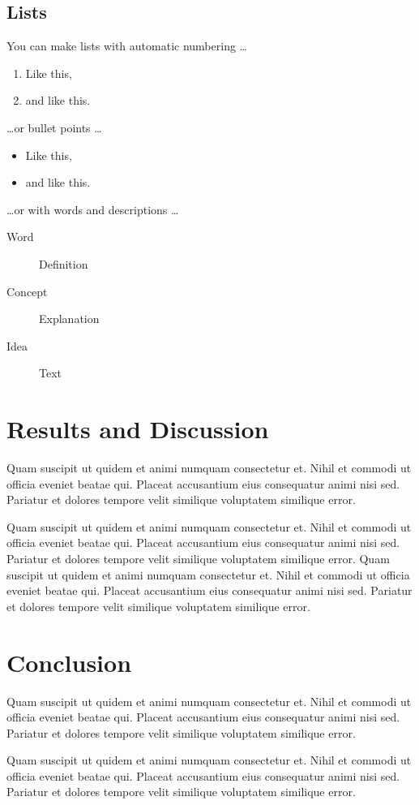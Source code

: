 \documentclass[fleqn,10pt]{amj}
\begin{document}
\subsection{Lists}

You can make lists with automatic numbering \dots

\begin{enumerate}[noitemsep] 
\item Like this,
\item and like this.
\end{enumerate}
\dots or bullet points \dots
\begin{itemize}[noitemsep] 
\item Like this,
\item and like this.
\end{itemize}
\dots or with words and descriptions \dots
\begin{description}
\item[Word] Definition
\item[Concept] Explanation
\item[Idea] Text
\end{description}

\section{Results and Discussion}
Quam suscipit ut quidem et animi numquam consectetur et. Nihil et commodi ut officia eveniet beatae qui. Placeat accusantium eius consequatur animi nisi sed. Pariatur et dolores tempore velit similique voluptatem similique error.

Quam suscipit ut quidem et animi numquam consectetur et. Nihil et commodi ut officia eveniet beatae qui. Placeat accusantium eius consequatur animi nisi sed. Pariatur et dolores tempore velit similique voluptatem similique error. Quam suscipit ut quidem et animi numquam consectetur et. Nihil et commodi ut officia eveniet beatae qui. Placeat accusantium eius consequatur animi nisi sed. Pariatur et dolores tempore velit similique voluptatem similique error.

\section{Conclusion}

Quam suscipit ut quidem et animi numquam consectetur et. Nihil et commodi ut officia eveniet beatae qui. Placeat accusantium eius consequatur animi nisi sed. Pariatur et dolores tempore velit similique voluptatem similique error.

Quam suscipit ut quidem et animi numquam consectetur et. Nihil et commodi ut officia eveniet beatae qui. Placeat accusantium eius consequatur animi nisi sed. Pariatur et dolores tempore velit similique voluptatem similique error.

\end{document}
